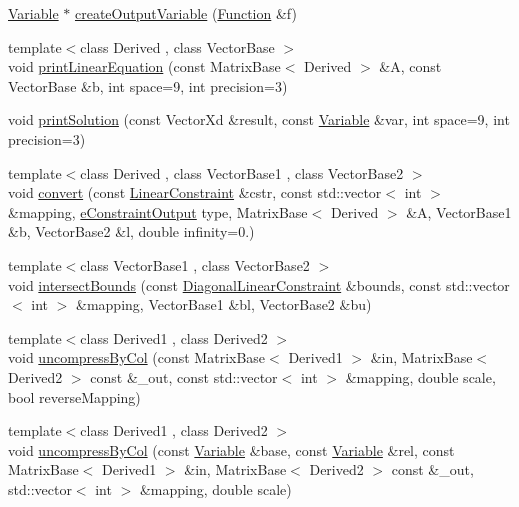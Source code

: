 \begin{DoxyCompactItemize}
\hyperlink{classocra_1_1Variable}{Variable} $\ast$ \hyperlink{namespaceocra_1_1utils_ab8a4ac5aa3bfae2c0732c7abd21a84c9}{create\+Output\+Variable} (\hyperlink{classocra_1_1Function}{Function} \&f)
\item 
{\footnotesize template$<$class Derived , class Vector\+Base $>$ }\\void \hyperlink{namespaceocra_1_1utils_aaf649f13f39cd8d32b0311ac2bfe2b4d}{print\+Linear\+Equation} (const Matrix\+Base$<$ Derived $>$ \&A, const Vector\+Base \&b, int space=9, int precision=3)
\item 
void \hyperlink{namespaceocra_1_1utils_aa928598a03da10c32b029f77c571788a}{print\+Solution} (const Vector\+Xd \&result, const \hyperlink{classocra_1_1Variable}{Variable} \&var, int space=9, int precision=3)
\item 
{\footnotesize template$<$class Derived , class Vector\+Base1 , class Vector\+Base2 $>$ }\\void \hyperlink{namespaceocra_1_1utils_a5d9dfa0a2dc2197c50ba35951f19586e}{convert} (const \hyperlink{namespaceocra_ae8b87cf4099be3efc3b410019ad2046e}{Linear\+Constraint} \&cstr, const std\+::vector$<$ int $>$ \&mapping, \hyperlink{namespaceocra_abc43c1cc74267805f1cc799c4ac27051}{e\+Constraint\+Output} type, Matrix\+Base$<$ Derived $>$ \&A, Vector\+Base1 \&b, Vector\+Base2 \&l, double infinity=0.)
\item 
{\footnotesize template$<$class Vector\+Base1 , class Vector\+Base2 $>$ }\\void \hyperlink{namespaceocra_1_1utils_aa835270370ca3a7f7b9e2858ef37dae0}{intersect\+Bounds} (const \hyperlink{namespaceocra_ab310e2c53f5e52ec3aba0a832f7dc79e}{Diagonal\+Linear\+Constraint} \&bounds, const std\+::vector$<$ int $>$ \&mapping, Vector\+Base1 \&bl, Vector\+Base2 \&bu)
\item 
{\footnotesize template$<$class Derived1 , class Derived2 $>$ }\\void \hyperlink{namespaceocra_1_1utils_adecf442a59dee26f5836a070533bcac4}{uncompress\+By\+Col} (const Matrix\+Base$<$ Derived1 $>$ \&in, Matrix\+Base$<$ Derived2 $>$ const \&\+\_\+out, const std\+::vector$<$ int $>$ \&mapping, double scale, bool reverse\+Mapping)
\item 
{\footnotesize template$<$class Derived1 , class Derived2 $>$ }\\void \hyperlink{namespaceocra_1_1utils_ae2055de35b65215e1f23b0988fe20705}{uncompress\+By\+Col} (const \hyperlink{classocra_1_1Variable}{Variable} \&base, const \hyperlink{classocra_1_1Variable}{Variable} \&rel, const Matrix\+Base$<$ Derived1 $>$ \&in, Matrix\+Base$<$ Derived2 $>$ const \&\+\_\+out, std\+::vector$<$ int $>$ \&mapping, double scale)

\end{DoxyCompactItemize}
